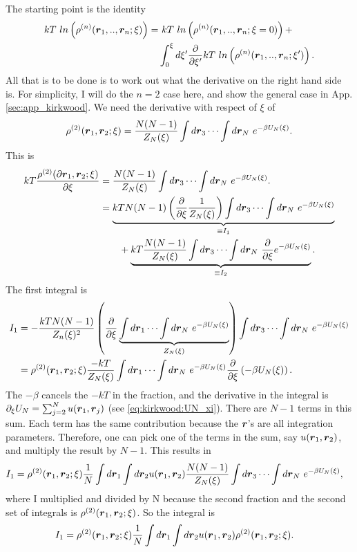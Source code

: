 The starting point is the identity
\begin{align}
kT~ln\left(\rho^{(n)}(\boldsymbol{r}_1,..,\boldsymbol{r}_n;\xi)\right) =
&~ kT~ln\left(\rho^{(n)}(\boldsymbol{r}_1,..,\boldsymbol{r}_n;\xi=0)\right) + \nonumber \\
& \int_0^\xi d\xi' \frac{\partial}{\partial \xi'}
kT~ln\left(\rho^{(n)}(\boldsymbol{r}_1,..,\boldsymbol{r}_n;\xi')\right).
\end{align}
All that is to be done is to work out what the derivative on the right hand side is.
For simplicity, I will do the $n=2$ case here, and show the general case in App. \ref{sec:app_kirkwood}.
We need the derivative with respect of $\xi$ of
\begin{align}
\rho^{(2)}(\boldsymbol{r}_1,\boldsymbol{r}_2;\xi) =
\frac{N(N-1)}{Z_N(\xi)} \int d\boldsymbol{r}_3 \cdots \int d\boldsymbol{r}_N~
e^{-\beta U_N(\xi)}.
\end{align}
This is
\begin{align}\label{eq:kirkwood:first_deriv}
k T \frac{\rho^{(2)}(\partial \boldsymbol{r}_1,\boldsymbol{r}_2;\xi)}{\partial \xi} &=
\frac{N(N-1)}{Z_N(\xi)} \int d\boldsymbol{r}_3 \cdots \int d\boldsymbol{r}_N~
    e^{-\beta U_N(\xi)}. \\
&= 
    \underbrace{kT N (N-1) \left( \frac{\partial}{\partial \xi}
    \frac{1}{Z_N(\xi)} \right)
    \int d\boldsymbol{r}_3 \cdots \int d\boldsymbol{r}_N~ e^{-\beta U_N(\xi)}
    }_{ \equiv I_1}
    \nonumber \\
    &~~~~~~
    +\underbrace{ kT \frac{N(N-1)}{Z_N(\xi)}
    \int d\boldsymbol{r}_3 \cdots \int d\boldsymbol{r}_N~
    \frac{\partial}{\partial \xi}e^{-\beta U_N(\xi)}
    }_{\equiv I_2}.
\end{align}
The first integral is
\begin{align}
I_1 &= -\frac{kT N(N-1)}{Z_n(\xi)^2}
    \left( \frac{\partial}{\partial \xi}
        \underbrace{
        \int d\boldsymbol{r}_1 \cdots \int d\boldsymbol{r}_N~ e^{-\beta U_N(\xi)}
        }_{Z_N(\xi)}
    \right)
    \int d\boldsymbol{r}_3 \cdots \int d\boldsymbol{r}_N~ e^{-\beta U_N(\xi)} \\
&= \rho^{(2)}(\boldsymbol{r}_1,\boldsymbol{r}_2;\xi) \frac{-kT}{Z_N(\xi)}
    \int d\boldsymbol{r}_1 \cdots \int d\boldsymbol{r}_N~ e^{-\beta U_N(\xi)}
        \frac{\partial}{\partial \xi}
        \left( - \beta U_N(\xi) \right).
\end{align}
The $-\beta$ cancels the $-kT$ in the fraction, and the derivative in the integral is $\partial_\xi U_N = \sum_{j=2}^N u(\boldsymbol{r}_1,\boldsymbol{r}_j)$ (see \eqref{eq:kirkwood:UN_xi}).
There are $N-1$ terms in this sum.
Each term has the same contribution because the $\boldsymbol{r}$'s are all integration parameters.
Therefore, one can pick one of the terms in the sum, say $u(\boldsymbol{r}_1,\boldsymbol{r}_2)$, and multiply the result by $N-1$.
This results in
\begin{align}
I_1 &= \rho^{(2)}(\boldsymbol{r}_1,\boldsymbol{r}_2;\xi)\frac{1}{N}
    \int d\boldsymbol{r}_1 \int d\boldsymbol{r}_2 u(\boldsymbol{r}_1,\boldsymbol{r}_2)
    \frac{N(N-1)}{Z_N(\xi)}
    \int d\boldsymbol{r}_3 \cdots \int d\boldsymbol{r}_N~ e^{-\beta U_N(\xi)},
\end{align}
where I multiplied and divided by N because the second fraction and the second set of integrals is $\rho^{(2)}(\boldsymbol{r}_1,\boldsymbol{r}_2;\xi)$.
So the integral is
\begin{align}
I_1 &= \rho^{(2)}(\boldsymbol{r}_1,\boldsymbol{r}_2;\xi)\frac{1}{N}
    \int d\boldsymbol{r}_1 \int d\boldsymbol{r}_2 u(\boldsymbol{r}_1,\boldsymbol{r}_2)
    \rho^{(2)}(\boldsymbol{r}_1,\boldsymbol{r}_2;\xi).
\end{align}

